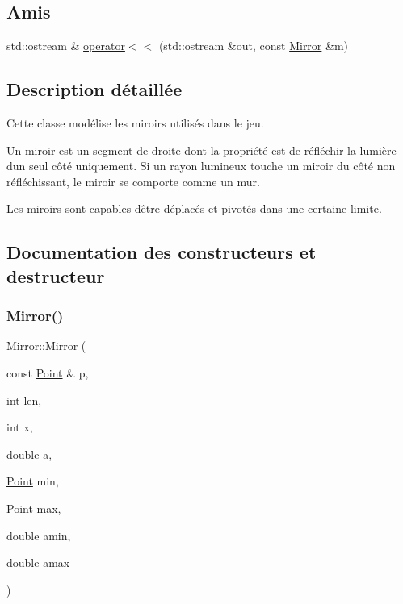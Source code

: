 \subsection*{Amis}
\begin{DoxyCompactItemize}
\item 
std\+::ostream \& \mbox{\hyperlink{class_mirror_a18a9b61e5b925d085bd1560fcf289b0c}{operator$<$$<$}} (std\+::ostream \&out, const \mbox{\hyperlink{class_mirror}{Mirror}} \&m)
\end{DoxyCompactItemize}


\subsection{Description détaillée}
Cette classe modélise les miroirs utilisés dans le jeu. 

Un miroir est un segment de droite dont la propriété est de réfléchir la lumière d\textquotesingle{}un seul côté uniquement. Si un rayon lumineux touche un miroir du côté non réfléchissant, le miroir se comporte comme un mur. 

Les miroirs sont capables d\textquotesingle{}être déplacés et pivotés dans une certaine limite. 

\subsection{Documentation des constructeurs et destructeur}
\mbox{\label{class_mirror_abc3fa4b3569596f9234cece92dbdc677}} 
\subsubsection{\texorpdfstring{Mirror()}{Mirror()}}
{\footnotesize\ttfamily Mirror\+::\+Mirror (\begin{DoxyParamCaption}\item[{const \mbox{\hyperlink{class_point}{Point}} \&}]{p,  }\item[{int}]{len,  }\item[{int}]{x,  }\item[{double}]{a,  }\item[{\mbox{\hyperlink{class_point}{Point}}}]{min,  }\item[{\mbox{\hyperlink{class_point}{Point}}}]{max,  }\item[{double}]{amin,  }\item[{double}]{amax }\end{DoxyParamCaption})}

